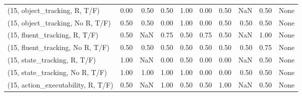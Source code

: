 \begin{table*}[h!]
\begin{adjustbox}{width=2\columnwidth,center}
\begin{tabular}{lrrr|rrr|rrr}
\midrule
(15, object\_tracking, R, T/F)         &                      0.00 &                  0.50 &                      0.50 &                          1.00 &                      0.00 &                          0.50 &                                    NaN &                               0.50 &                                  None \\
(15, object\_tracking, No R, T/F)      &                      0.50 &                  0.50 &                      0.00 &                          1.00 &                      0.00 &                          0.50 &                                   0.50 &                               0.50 &                                  None \\
(15, fluent\_tracking, R, T/F)         &                      0.50 &                   NaN &                      0.75 &                          0.50 &                      0.75 &                          0.50 &                                    NaN &                               1.00 &                                  None \\
(15, fluent\_tracking, No R, T/F)      &                      0.50 &                  0.50 &                      0.50 &                          0.50 &                      0.50 &                          0.50 &                                   0.50 &                               0.75 &                                  None \\
(15, state\_tracking, R, T/F)          &                      1.00 &                   NaN &                      0.00 &                          0.50 &                      0.00 &                          0.00 &                                    NaN &                               0.50 &                                  None \\
(15, state\_tracking, No R, T/F)       &                      1.00 &                  1.00 &                      1.00 &                          1.00 &                      0.00 &                          0.00 &                                   0.50 &                               0.50 &                                  None \\
(15, action\_executability, R, T/F)    &                      0.50 &                   NaN &                      1.00 &                          0.50 &                      0.50 &                          1.00 &                                    NaN &                               0.50 &                                  None \\

\end{tabular}
\end{adjustbox}
\end{table*}
